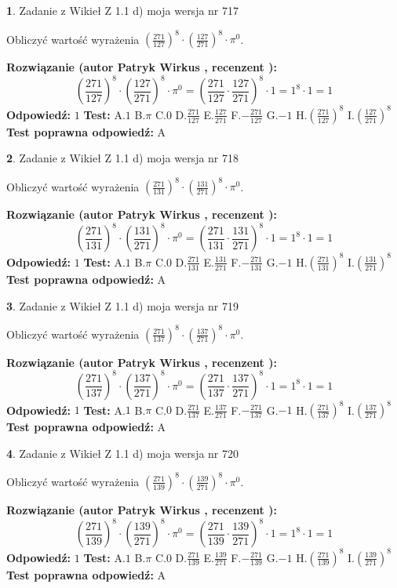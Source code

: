 \documentclass[12pt, a4paper]{article}
\theoremstyle{definition} %
\newtheorem{zad}{}
\newcommand{\zadStart}[1]{\begin{zad}#1\newline}
\newcommand{\zadStop}{\end{zad}}
\newcommand{\rozwStart}[2]{\noindent \textbf{Rozwiązanie (autor #1 , recenzent #2): }\newline}
\newcommand{\rozwStop}{\newline}
\newcommand{\odpStart}{\noindent \textbf{Odpowiedź:}\newline}
\newcommand{\odpStop}{\newline}
\newcommand{\testStart}{\noindent \textbf{Test:}\newline}
\newcommand{\testStop}{\newline}
\newcommand{\kluczStart}{\noindent \textbf{Test poprawna odpowiedź:}\newline}
\newcommand{\kluczStop}{\newline}
\begin{document}
\zadStart{Zadanie z Wikieł Z 1.1 d) moja wersja nr 717}

Obliczyć wartość wyrażenia $(\frac{271}{127})^{8} \cdot (\frac{127}{271})^{8} \cdot \pi^{0}$.
\zadStop
\rozwStart{Patryk Wirkus}{}
$$(\frac{271}{127})^{8} \cdot (\frac{127}{271})^{8} \cdot \pi^{0} = (\frac{271}{127} \cdot \frac{127}{271})^{8} \cdot 1 = 1^{8} \cdot 1 = 1$$
\rozwStop
\odpStart
$1$
\odpStop
\testStart
A.$1$ B.$\pi$ C.$0$ D.$\frac{271}{127}$ E.$\frac{127}{271}$
F.$-\frac{271}{127}$ G.$-1$
H.$(\frac{271}{127})^{8}$
I.$(\frac{127}{271})^{8}$
\testStop
\kluczStart
A
\kluczStop



\zadStart{Zadanie z Wikieł Z 1.1 d) moja wersja nr 718}

Obliczyć wartość wyrażenia $(\frac{271}{131})^{8} \cdot (\frac{131}{271})^{8} \cdot \pi^{0}$.
\zadStop
\rozwStart{Patryk Wirkus}{}
$$(\frac{271}{131})^{8} \cdot (\frac{131}{271})^{8} \cdot \pi^{0} = (\frac{271}{131} \cdot \frac{131}{271})^{8} \cdot 1 = 1^{8} \cdot 1 = 1$$
\rozwStop
\odpStart
$1$
\odpStop
\testStart
A.$1$ B.$\pi$ C.$0$ D.$\frac{271}{131}$ E.$\frac{131}{271}$
F.$-\frac{271}{131}$ G.$-1$
H.$(\frac{271}{131})^{8}$
I.$(\frac{131}{271})^{8}$
\testStop
\kluczStart
A
\kluczStop



\zadStart{Zadanie z Wikieł Z 1.1 d) moja wersja nr 719}

Obliczyć wartość wyrażenia $(\frac{271}{137})^{8} \cdot (\frac{137}{271})^{8} \cdot \pi^{0}$.
\zadStop
\rozwStart{Patryk Wirkus}{}
$$(\frac{271}{137})^{8} \cdot (\frac{137}{271})^{8} \cdot \pi^{0} = (\frac{271}{137} \cdot \frac{137}{271})^{8} \cdot 1 = 1^{8} \cdot 1 = 1$$
\rozwStop
\odpStart
$1$
\odpStop
\testStart
A.$1$ B.$\pi$ C.$0$ D.$\frac{271}{137}$ E.$\frac{137}{271}$
F.$-\frac{271}{137}$ G.$-1$
H.$(\frac{271}{137})^{8}$
I.$(\frac{137}{271})^{8}$
\testStop
\kluczStart
A
\kluczStop



\zadStart{Zadanie z Wikieł Z 1.1 d) moja wersja nr 720}

Obliczyć wartość wyrażenia $(\frac{271}{139})^{8} \cdot (\frac{139}{271})^{8} \cdot \pi^{0}$.
\zadStop
\rozwStart{Patryk Wirkus}{}
$$(\frac{271}{139})^{8} \cdot (\frac{139}{271})^{8} \cdot \pi^{0} = (\frac{271}{139} \cdot \frac{139}{271})^{8} \cdot 1 = 1^{8} \cdot 1 = 1$$
\rozwStop
\odpStart
$1$
\odpStop
\testStart
A.$1$ B.$\pi$ C.$0$ D.$\frac{271}{139}$ E.$\frac{139}{271}$
F.$-\frac{271}{139}$ G.$-1$
H.$(\frac{271}{139})^{8}$
I.$(\frac{139}{271})^{8}$
\testStop
\kluczStart
A
\kluczStop
\end{document}
